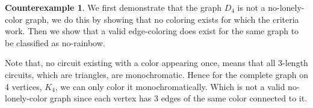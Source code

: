 \documentclass[a4paper,10pt]{article}
\numberwithin{equation}{section}
\theoremstyle{definition}
\newtheorem*{counterexample}{Counterexample}
\begin{document}
    \begin{counterexample}
        We first demonstrate that the graph \(D_4\) is not a no-lonely-color graph, we do this by showing that no coloring exists for which the criteria work. Then we show that a valid edge-coloring does exist for the same graph to be classified as no-rainbow.
        \leavevmode\par
        \begin{center}
        \end{center}
        Note that, no circuit existing with a color appearing once, means that all 3-length circuits, which are triangles, are monochromatic. Hence for the complete graph on 4 vertices, \(K_4\), we can only color it monochromatically. Which is not a valid no-lonely-color graph since each vertex has 3 edges of the same color connected to it.
        \leavevmode\par
        \begin{center}
\end{center}
\end{counterexample}
\end{document}

